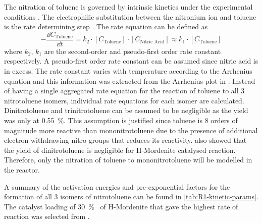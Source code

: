 
The nitration of toluene is governed by intrinsic kinetics under the experimental conditions \cite{jeeru_kinetics_2018}. The electrophilic substitution between the  nitronium ion and toluene is the rate determining step \cite{carey_advanced_2007}. The rate equation can be defined as  
\begin{equation}
-\frac{\dd C_\mathrm{Toluene}}{\dd t} = k_{2} \cdot [C_\mathrm{Toluene}] \cdot [C_\text{Nitric Acid}] \approx k_{1} \cdot [C_\mathrm{Toluene}]
\end{equation}
where $k_2$, $k_1$ are the second-order and pseudo-first order rate constant respectively. A pseudo-first order rate constant can be assumed since nitric acid is in excess. The rate constant varies with temperature according to the Arrhenius equation and this information was extracted from the Arrhenius plot in \textcite{jeeru_kinetics_2018}. Instead of having a single aggregated rate equation for the reaction of toluene to all 3 nitrotoluene isomers, individual rate equations for each isomer are calculated. Dinitrotoluene and trinitrotoluene can be assumed to be negligible as the yield was only at \SI{0.55}{\percent}. This assumption is justified since toluene is 8 orders of magnitude more reactive than mononitrotoluene \cite{barden_study_2003} due to the presence of additional electron-withdrawing nitro groups that reduces its reactivity. \textcite{vassena_highly_2000} also showed that the yield of dinitrotoluene is negligible for H-Mordenite catalysed reaction. Therefore, only the nitration of toluene to mononitrotoluene will be modelled in the reactor.

A summary of the activation energies and pre-exponential factors for the formation of all 3 isomers of nitrotoluene can be found in \cref{tab:R1-kinetic-params}. The catalyst loading of \SI{30}{\percent\wv} of H-Mordenite that gave the highest rate of reaction was selected from \textcite{jeeru_kinetics_2018}.
